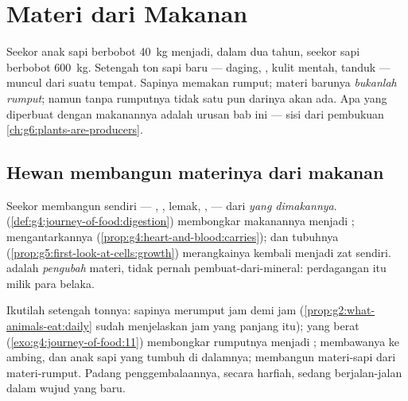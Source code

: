 \chapter{Materi dari Makanan}\label{ch:g6:matter-from-food}

Seekor anak sapi berbobot \qty{40}{kg} menjadi, dalam dua tahun,
seekor sapi berbobot \qty{600}{kg}. Setengah ton sapi baru --- daging,
, kulit mentah, tanduk --- muncul dari suatu tempat. Sapinya memakan
rumput; materi barunya \emph{bukanlah rumput}; namun tanpa rumputnya
tidak satu pun darinya akan ada. Apa yang diperbuat  dengan
makanannya adalah urusan bab ini --- sisi  dari pembukuan
\cref{ch:g6:plants-are-producers}.

\section{Hewan membangun materinya dari makanan}

\begin{proposition}\label{prop:g6:matter-from-food:transform}
Seekor  membangun  sendiri --- , ,
lemak, ,  --- dari \emph{ yang
dimakannya}.  (\cref{def:g4:journey-of-food:digestion})
membongkar makanannya menjadi ;  mengantarkannya
(\cref{prop:g4:heart-and-blood:carries}); dan  tubuhnya
(\cref{prop:g5:first-look-at-cells:growth}) merangkainya kembali
menjadi zat  sendiri.  adalah \emph{pengubah} materi,
tidak pernah pembuat-dari-mineral: perdagangan itu milik para 
belaka.
\end{proposition}
\admitted

\begin{example}\label{ex:g6:matter-from-food:cow}
Ikutilah setengah tonnya: sapinya merumput jam demi jam
(\cref{prop:g2:what-animals-eat:daily} sudah menjelaskan jam yang
panjang itu);  yang berat
(\cref{exo:g4:journey-of-food:11}) membongkar rumputnya menjadi ;  membawanya ke ambing,  dan anak sapi yang tumbuh di
dalamnya;  membangun materi-sapi dari materi-rumput. Padang
penggembalaannya, secara harfiah, sedang berjalan-jalan dalam wujud
yang baru.
\end{example}

